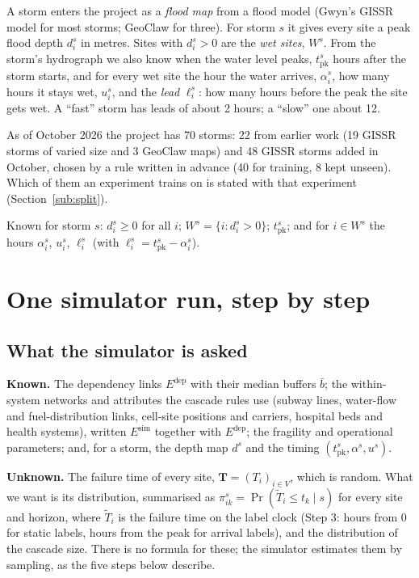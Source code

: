 \documentclass[11pt]{article}
\newcommand{\pk}{\mathrm{pk}}
\newcommand{\dep}{\mathrm{dep}}
\begin{document}
A storm enters the project as a \emph{flood map} from a flood model (Gwyn's GISSR model for most storms; GeoClaw for three). For storm $s$ it gives every site a peak flood depth $d_i^s$ in metres. Sites with $d_i^s>0$ are the \emph{wet sites}, $W^s$. From the storm's hydrograph we also know when the water level peaks, $t^s_{\pk}$ hours after the storm starts, and for every wet site the hour the water arrives, $\alpha_i^s$, how many hours it stays wet, $u_i^s$, and the \emph{lead} $\ell_i^s$: how many hours before the peak the site gets wet. A ``fast'' storm has leads of about 2 hours; a ``slow'' one about 12.

As of October 2026 the project has 70 storms: 22 from earlier work (19 GISSR storms of varied size and 3 GeoClaw maps) and 48 GISSR storms added in October, chosen by a rule written in advance (40 for training, 8 kept unseen). Which of them an experiment trains on is stated with that experiment (Section~\ref{sub:split}).

\begin{maths}
Known for storm $s$: $d_i^s\ge0$ for all $i$; $W^s=\{i:d_i^s>0\}$; $t^s_{\pk}$; and for $i\in W^s$ the hours $\alpha_i^s$, $u_i^s$, $\ell_i^s$ (with $\ell_i^s = t^s_{\pk}-\alpha_i^s$).
\end{maths}

\section{One simulator run, step by step}\label{sec:run}

\subsection{What the simulator is asked}\label{sub:simproblem}

\begin{askbox}
\textbf{Known.} The dependency links $E^{\dep}$ with their median buffers $\bar b$; the within-system networks and attributes the cascade rules use (subway lines, water-flow and fuel-distribution links, cell-site positions and carriers, hospital beds and health systems), written $E^{\mathrm{sim}}$ together with $E^{\dep}$; the fragility and operational parameters; and, for a storm, the depth map $d^s$ and the timing $(t^s_{\pk},\alpha^s,u^s)$.

\textbf{Unknown.} The failure time of every site, $\mathbf T=(T_i)_{i\in V}$, which is random. What we want is its distribution, summarised as $\pi^s_{ik}=\Pr(\tilde T_i\le t_k\mid s)$ for every site and horizon, where $\tilde T_i$ is the failure time on the label clock (Step 3: hours from 0 for static labels, hours from the peak for arrival labels), and the distribution of the cascade size. There is no formula for these; the simulator estimates them by sampling, as the five steps below describe.
\end{askbox}
\end{document}
